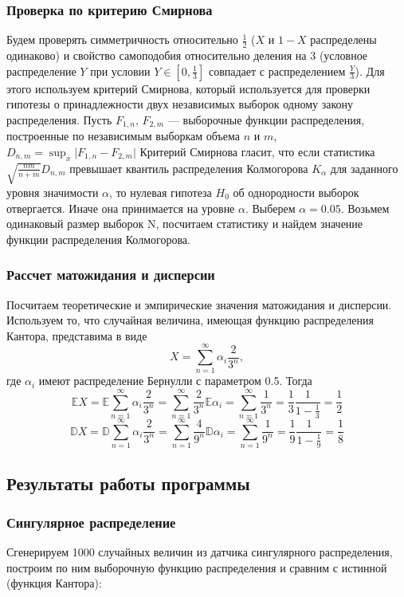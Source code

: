 \documentclass{article}
\theoremstyle{definition}
\begin{document}
\subsubsection{Проверка по критерию Смирнова}
Будем проверять симметричность относительно $\frac{1}{2}$ ($X$ и $1 - X$ распределены одинаково) и свойство самоподобия относительно деления на 3 (условное распределение $Y$ при условии $Y \in [0, \frac{1}{3}]$ совпадает с распределением $\frac{Y}{3}$). Для этого используем критерий Смирнова, который используется для проверки гипотезы о принадлежности двух независимых выборок одному закону распределения. Пусть $F_{1, n},\, F_{2, m}$ --- выборочные функции распределения, построенные по независимым выборкам объема $n$ и $m$, $D_{n, m} = \sup_x \lvert F_{1, n} - F_{2, m} \rvert$ Критерий Смирнова гласит, что если статистика $\sqrt{\frac{nm}{n + m}}D_{n, m}$ превышает квантиль распределения Колмогорова $K_{\alpha}$ для заданного уровня значимости $\alpha$, то нулевая гипотеза $H_0$ об однородности выборок отвергается. Иначе она принимается на уровне $\alpha$. Выберем $\alpha = 0.05$. Возьмем одинаковый размер выборок N, посчитаем статистику и найдем значение функции распределения Колмогорова.

\subsubsection{Рассчет матожидания и дисперсии}

Посчитаем теоретические и эмпирические значения матожидания и дисперсии. Используем то, что случайная величина, имеющая функцию распределения Кантора, представима в виде
$$X = \sum_{n = 1}^\infty \alpha_i\frac{2}{3^n},$$
где $\alpha_i$ имеют распределение Бернулли с параметром 0.5. Тогда
$$\mathbb{E}X = \mathbb{E}\sum_{n = 1}^\infty \alpha_i\frac{2}{3^n} = \sum_{n = 1}^\infty \frac{2}{3^n}\mathbb{E}\alpha_i = \sum_{n = 1}^\infty \frac{1}{3^n} = \frac{1}{3}\frac{1}{1-\frac{1}{3}} = \frac{1}{2}$$
$$\mathbb{D}X = \mathbb{D}\sum_{n = 1}^\infty \alpha_i\frac{2}{3^n} = \sum_{n = 1}^\infty\frac{4}{9^n}\mathbb{D}\alpha_i = \sum_{n = 1}^\infty\frac{1}{9^n} = \frac{1}{9}\frac{1}{1-\frac{1}{9}} = \frac{1}{8}$$

\subsection{Результаты работы программы}

\subsubsection{Сингулярное распределение}
Сгенерируем 1000 случайных величин из датчика сингулярного распределения, построим по ним выборочную функцию распределения и сравним с истинной (функция Кантора):
\end{document}
